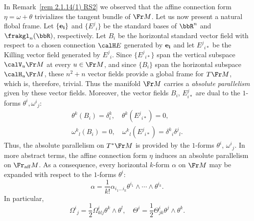 \begin{rem}\label{rem 2.1.14(2) RS2}
    In Remark~\ref{rem 2.1.14(1) RS2} we observed that the affine connection form $\eta=\omega+\theta$ trivializes the tangent bundle of $\Fr M$. Let us now present a natural flobal frame. Let $\{\bf{e}_i\}$ and $\{E^j{}_i\}$ be the standard bases of $\bbR^n$ and $\frakgl_n(\bbR)$, respectively. Let $B_i$ be the horizontal standard vector field with respect to a chosen connection $\calH E$ generated by $\bf{e}_i$ and let $E^j{}_{i\ast}$ be the Killing vector field generated by $E^j{}_i$. Since $\{E^j{}_{i\ast}\}$ span the vertical subspace $\calV_u \Fr M$ at every $u\in\Fr M$, and since $\{B_i\}$ span the horizontal subspace $\calH_u \Fr M$, these $n^2+n$ vector fields provide a global frame for $T\Fr M$, which is, therefore, trivial. Thus the manifold $\Fr M$ carries a \emph{absolute parallelism} given by these vector fields. Moreover, the vector fields $B_i$, $E^j_{i\ast}$ are dual to the $1$-forms $\theta^i,\omega^i{}_j$:
    \begin{gather}
        \theta^k(B_i)=\delta^k_i,\quad \theta^k(E^j{}_{i\ast})=0,\\
        \omega^k{}_l(B_i)=0,\quad \omega^k{}_l(E^j{}_{i\ast})=\delta^k{}_i\delta^j{}_l.
    \end{gather}
    Thus, the absolute parallelism on $T^\ast\Fr M$ is provided by the $1$-forms $\theta^i$, $\omega^i{}_j$. In more abstract terms, the affine connection form $\eta$ induces an absolute parallelism on $\Fr_{\mathrm{aff}}M$. As a consequence, every horizontal $k$-form $\alpha$ on $\Fr M$ may be expanded with respect to the $1$-forms $\theta^i$:
    \[\alpha=\frac{1}{k!}\alpha_{i_1\ldots i_k}\theta^{i_1}\wedge \cdots\wedge \theta^{i_k}.\]
    In particular, 
    \[\Omega^i{}_j=\frac12 \Omega^i_{klj}\theta^k\wedge\theta^l,\quad \Theta^i=\frac12\Theta^i_{jk}\theta^j\wedge\theta^k.\label{eq 2.1.20 RS2}\]
\end{rem}

